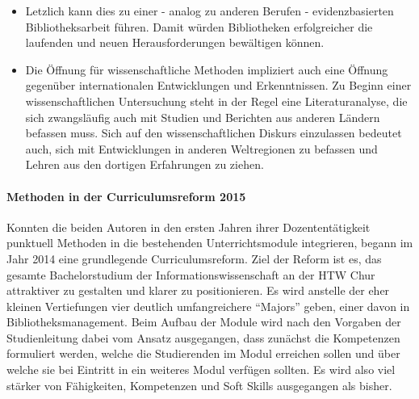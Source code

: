 \documentclass[a4paper,
fontsize=11pt,
oneside,
numbers=noperiodatend,
parskip=half-,
bibliography=totoc,
final
]{scrartcl}
\begin{document}
\begin{itemize}
  besser wird. Gleichzeitig würde so mehr Wissen produziert werden, das
  auch in den bibliothekswissenschaftlichen Diskurs einfliessen
  könnte.\footnote{Strukturell gesehen könnte damit die
    praxisorientierte Forschung, die bislang an den Fachhochschulen
    verortet wird, mehr in den Bibliotheken selber betrieben werden.
    Wäre eine ausreichende Forschungsfinanzierung gegeben, könnten die
    Fachhochschulen sich dann mit einer theoriegetriebenen Forschung
    befassen und somit den Wissensstand, auf dem praxisorientierte
    Forschung fussen soll, massiv erhöhen.}
\item
  Letzlich kann dies zu einer - analog zu anderen Berufen -
  evidenzbasierten Bibliotheksarbeit führen. Damit würden Bibliotheken
  erfolgreicher die laufenden und neuen Herausforderungen bewältigen
  können.
\item
  Die Öffnung für wissenschaftliche Methoden impliziert auch eine
  Öffnung gegenüber internationalen Entwicklungen und Erkenntnissen. Zu
  Beginn einer wissenschaftlichen Untersuchung steht in der Regel eine
  Literaturanalyse, die sich zwangsläufig auch mit Studien und Berichten
  aus anderen Ländern befassen muss. Sich auf den wissenschaftlichen
  Diskurs einzulassen bedeutet auch, sich mit Entwicklungen in anderen
  Weltregionen zu befassen und Lehren aus den dortigen Erfahrungen zu
  ziehen.
\end{itemize}

\paragraph{Methoden in der Curriculumsreform
2015}\label{methoden-in-der-curriculumsreform-2015}

Konnten die beiden Autoren in den ersten Jahren ihrer Dozententätigkeit
punktuell Methoden in die bestehenden Unterrichtsmodule integrieren,
begann im Jahr 2014 eine grundlegende Curriculumsreform. Ziel der Reform
ist es, das gesamte Bachelorstudium der Informationswissenschaft an der
HTW Chur attraktiver zu gestalten und klarer zu positionieren. Es wird
anstelle der eher kleinen Vertiefungen vier deutlich umfangreichere
\enquote{Majors} geben, einer davon in Bibliotheksmanagement. Beim
Aufbau der Module wird nach den Vorgaben der Studienleitung dabei vom
Ansatz ausgegangen, dass zunächst die Kompetenzen formuliert werden,
welche die Studierenden im Modul erreichen sollen und über welche sie
bei Eintritt in ein weiteres Modul verfügen sollten. Es wird also viel
stärker von Fähigkeiten, Kompetenzen und Soft Skills ausgegangen als
bisher.
\end{document}
